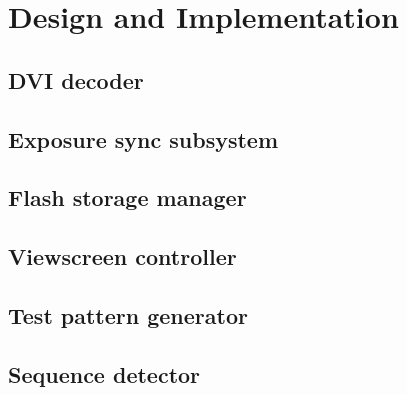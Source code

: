 \chapter{Design and Implementation}





\section{DVI decoder}

\section{Exposure sync subsystem}
\section{Flash storage manager}
\section{Viewscreen controller}
\section{Test pattern generator}
\section{Sequence detector}